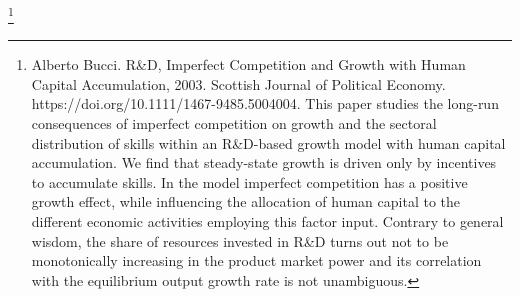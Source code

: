 
\footnote{Alberto Bucci.  R\&D, Imperfect Competition and Growth with Human Capital Accumulation, 2003. Scottish Journal of Political Economy. https://doi.org/10.1111/1467-9485.5004004. This paper studies the long-run consequences of imperfect competition on growth and the sectoral distribution of skills within an R\&D-based growth model with human capital accumulation. We find that steady-state growth is driven only by incentives to accumulate skills. In the model imperfect competition has a positive growth effect, while influencing the allocation of human capital to the different economic activities employing this factor input. Contrary to general wisdom, the share of resources invested in R\&D turns out not to be monotonically increasing in the product market power and its correlation with the equilibrium output growth rate is not unambiguous.}